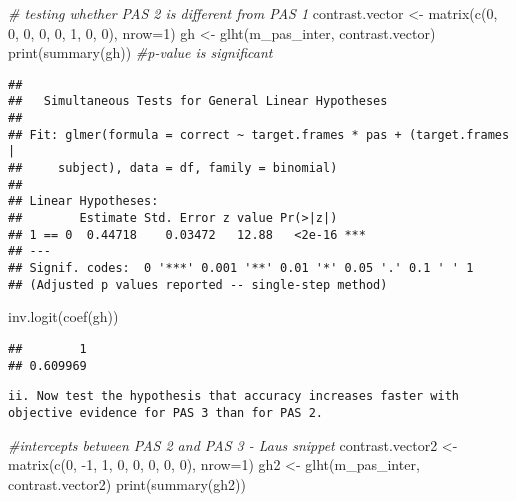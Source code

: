 \documentclass[
]{article}
\newenvironment{Shaded}{\begin{snugshade}}{\end{snugshade}}
\newcommand{\AttributeTok}[1]{\textcolor[rgb]{0.77,0.63,0.00}{#1}}
\newcommand{\CommentTok}[1]{\textcolor[rgb]{0.56,0.35,0.01}{\textit{#1}}}
\newcommand{\DecValTok}[1]{\textcolor[rgb]{0.00,0.00,0.81}{#1}}
\newcommand{\FunctionTok}[1]{\textcolor[rgb]{0.00,0.00,0.00}{#1}}
\newcommand{\NormalTok}[1]{#1}
\newcommand{\OtherTok}[1]{\textcolor[rgb]{0.56,0.35,0.01}{#1}}
\newcommand{\SpecialCharTok}[1]{\textcolor[rgb]{0.00,0.00,0.00}{#1}}
\begin{document}
\begin{Shaded}
\begin{Highlighting}[]
\CommentTok{\# testing whether PAS 2 is different from PAS 1}
\NormalTok{contrast.vector }\OtherTok{\textless{}{-}} \FunctionTok{matrix}\NormalTok{(}\FunctionTok{c}\NormalTok{(}\DecValTok{0}\NormalTok{, }\DecValTok{0}\NormalTok{, }\DecValTok{0}\NormalTok{, }\DecValTok{0}\NormalTok{, }\DecValTok{0}\NormalTok{, }\DecValTok{1}\NormalTok{, }\DecValTok{0}\NormalTok{, }\DecValTok{0}\NormalTok{), }\AttributeTok{nrow=}\DecValTok{1}\NormalTok{)}
\NormalTok{gh }\OtherTok{\textless{}{-}} \FunctionTok{glht}\NormalTok{(m\_pas\_inter, contrast.vector)}
\FunctionTok{print}\NormalTok{(}\FunctionTok{summary}\NormalTok{(gh)) }\CommentTok{\#p{-}value is significant}
\end{Highlighting}
\end{Shaded}

\begin{verbatim}
## 
##   Simultaneous Tests for General Linear Hypotheses
## 
## Fit: glmer(formula = correct ~ target.frames * pas + (target.frames | 
##     subject), data = df, family = binomial)
## 
## Linear Hypotheses:
##        Estimate Std. Error z value Pr(>|z|)    
## 1 == 0  0.44718    0.03472   12.88   <2e-16 ***
## ---
## Signif. codes:  0 '***' 0.001 '**' 0.01 '*' 0.05 '.' 0.1 ' ' 1
## (Adjusted p values reported -- single-step method)
\end{verbatim}

\begin{Shaded}
\begin{Highlighting}[]
\FunctionTok{inv.logit}\NormalTok{(}\FunctionTok{coef}\NormalTok{(gh))}
\end{Highlighting}
\end{Shaded}

\begin{verbatim}
##        1 
## 0.609969
\end{verbatim}

\begin{verbatim}
ii. Now test the hypothesis that accuracy increases faster with objective evidence for PAS 3 than for PAS 2.
\end{verbatim}

\begin{Shaded}
\begin{Highlighting}[]
\CommentTok{\#intercepts between PAS 2 and PAS 3 {-}  Lau\textquotesingle{}s snippet}
\NormalTok{contrast.vector2 }\OtherTok{\textless{}{-}} \FunctionTok{matrix}\NormalTok{(}\FunctionTok{c}\NormalTok{(}\DecValTok{0}\NormalTok{, }\SpecialCharTok{{-}}\DecValTok{1}\NormalTok{, }\DecValTok{1}\NormalTok{, }\DecValTok{0}\NormalTok{, }\DecValTok{0}\NormalTok{, }\DecValTok{0}\NormalTok{, }\DecValTok{0}\NormalTok{, }\DecValTok{0}\NormalTok{), }\AttributeTok{nrow=}\DecValTok{1}\NormalTok{)}
\NormalTok{gh2 }\OtherTok{\textless{}{-}} \FunctionTok{glht}\NormalTok{(m\_pas\_inter, contrast.vector2)}
\FunctionTok{print}\NormalTok{(}\FunctionTok{summary}\NormalTok{(gh2))}
\end{Highlighting}
\end{Shaded}
\end{document}
